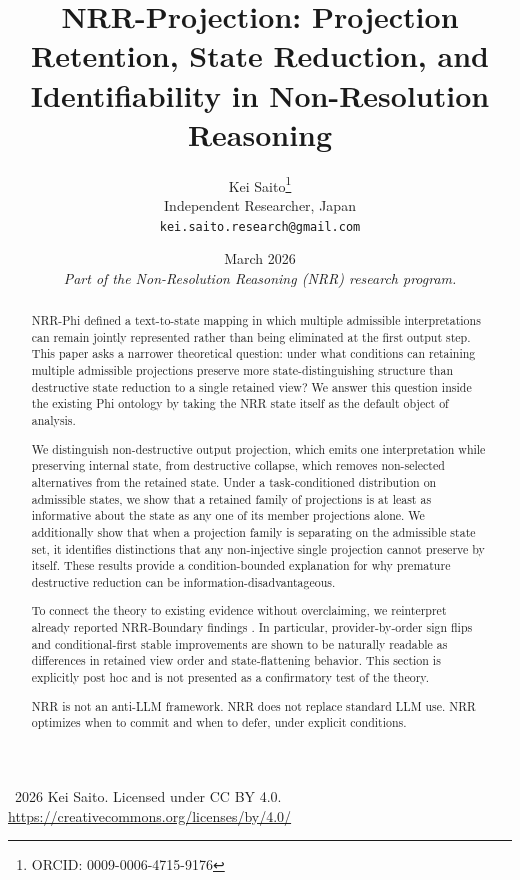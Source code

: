 \documentclass[11pt,a4paper]{article}
\title{\textbf{NRR-Projection: Projection Retention, State Reduction, and Identifiability in Non-Resolution Reasoning}}
\author{
  Kei Saito\thanks{ORCID: 0009-0006-4715-9176} \\
  Independent Researcher, Japan \\
  \texttt{kei.saito.research@gmail.com}
}
\date{March 2026 \\[0.5em]
\textit{Part of the Non-Resolution Reasoning (NRR) research program.}}
\begin{document}
\maketitle

\begin{center}
\textcopyright\ 2026 Kei Saito.
Licensed under CC BY 4.0.\\
\url{https://creativecommons.org/licenses/by/4.0/}
\end{center}

\begin{abstract}
NRR-Phi \cite{saito2026phi} defined a text-to-state mapping in which multiple admissible interpretations can remain jointly represented rather than being eliminated at the first output step. This paper asks a narrower theoretical question: under what conditions can retaining multiple admissible projections preserve more state-distinguishing structure than destructive state reduction to a single retained view? We answer this question inside the existing Phi ontology by taking the NRR state itself as the default object of analysis.

We distinguish non-destructive output projection, which emits one interpretation while preserving internal state, from destructive collapse, which removes non-selected alternatives from the retained state. Under a task-conditioned distribution on admissible states, we show that a retained family of projections is at least as informative about the state as any one of its member projections alone. We additionally show that when a projection family is separating on the admissible state set, it identifies distinctions that any non-injective single projection cannot preserve by itself. These results provide a condition-bounded explanation for why premature destructive reduction can be information-disadvantageous.

To connect the theory to existing evidence without overclaiming, we reinterpret already reported NRR-Boundary findings \cite{saito2026boundary}. In particular, provider-by-order sign flips and conditional-first stable improvements are shown to be naturally readable as differences in retained view order and state-flattening behavior. This section is explicitly post hoc and is not presented as a confirmatory test of the theory.

NRR is not an anti-LLM framework. NRR does not replace standard LLM use. NRR optimizes when to commit and when to defer, under explicit conditions.
\end{abstract}
\end{document}
